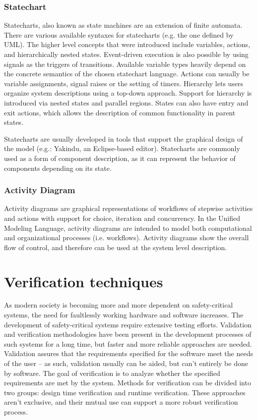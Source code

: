 \subsubsection{Statechart}

Statecharts, also known as state machines are an extension of finite automata. There are various available syntaxes for statecharts (e.g. the one defined by UML\citep{stcuml}). The higher level concepts that were introduced include variables, actions, and hierarchically nested states. Event-driven execution is also possible by using signals as the triggers of transitions. Available variable types heavily depend on the concrete semantics of the chosen statechart language. Actions can usually be variable assignments, signal raises or the setting of timers. Hierarchy lets users organize system descriptions using a top-down approach. Support for hierarchy is introduced via nested states and parallel regions. States can also have entry and exit actions, which allows the description of common functionality in parent states\citep{stcmove}.%

Statecharts are usually developed in tools that support the graphical design of the model (e.g.: Yakindu\citep{yakinduu}, an Eclipse-based editor).
Statecharts are commonly used as a form of component description, as it can represent the behavior of components depending on its state.

\subsubsection{Activity Diagram}

Activity diagrams are graphical representations of workflows of stepwise activities and actions with support for choice, iteration and concurrency. In the Unified Modeling Language, activity diagrams are intended to model both computational and organizational processes (i.e. workflows). Activity diagrams show the overall flow of control, and therefore can be used at the system level description.

\section{Verification techniques} 

As modern society is becoming more and more dependent on safety-critical systems, the need for faultlessly working hardware and software increases. The development of safety-critical systems require extensive testing efforts. Validation and verification methodologies have been present in the development processes of such systems for a long time\citep{ieee1012}, but faster and more reliable approaches are needed. Validation assures that the requirements specified for the software meet the needs of the user -- as such, validation usually can be aided, but can’t entirely be done by software. The goal of verification is to analyze whether the specified requirements are met by the system. Methods for verification can be divided into two groups: design time verification and runtime verification. These approaches aren't exclusive, and their mutual use can support a more robust verification process.

